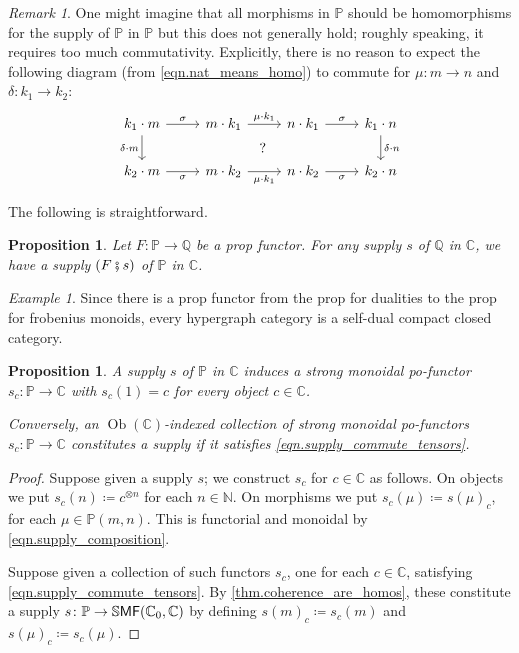 \documentclass[11pt, oneside, article]{memoir}
\theoremstyle{plain}
\newtheorem{proposition}[theorem]{Proposition}
\theoremstyle{definition}
\theoremstyle{remark}
\newtheorem{example}[theorem]{Example}
\newtheorem{remark}[theorem]{Remark}
\newcommand{\Set}[1]{\mathrm{#1}}%
\newcommand{\ccat}[1]{\mathbb{#1}}%
\newcommand{\Cat}[1]{{\mathsf{#1}}}%
\newcommand{\CCat}[1]{\mathbb{\StrLeft{#1}{1}}\Cat{\StrGobbleLeft{#1}{1}}}%
\DeclareMathOperator{\ob}{\Set{Ob}}
\newcommand{\tpow}[1]{^{\otimes #1}}
\newcommand{\ssmf}{\CCat{SMF}}
\newcommand{\cc}{\mathbb{C}}
\newcommand{\nn}{\mathbb{N}}
\newcommand{\pp}{\mathbb{P}}
\newcommand{\cp}{\mathbin{\fatsemi}}
\begin{document}
\begin{remark}
One might imagine that all morphisms in $\pp$ should be homomorphisms for the supply of $\pp$ in $\pp$ but this does not generally hold; roughly speaking, it requires too much commutativity. Explicitly, there is no reason to expect the following diagram (from \cref{eqn.nat_means_homo}) to commute for $\mu\colon m\to n$ and $\delta\colon k_1\to k_2$:
\[
\begin{tikzcd}
  k_1\cdot m\ar[r, "\sigma"]\ar[d, "\delta\cdot m"']&
  m\cdot k_1\ar[r, "\mu\cdot k_1"]\ar[dr, phantom, "?"]&
  n\cdot k_1\ar[r, "\sigma"]&
  k_1\cdot n\ar[d, "\delta\cdot n"]\\
  k_2\cdot m\ar[r, "\sigma"']&
  m\cdot k_2\ar[r, "\mu\cdot k_1"']&
  n\cdot k_2\ar[r, "\sigma"']&
  k_2\cdot n
\end{tikzcd}
\]
\end{remark}


The following is straightforward.
\begin{proposition}\label{prop.change_of_supply}
Let $F\colon\ccat{P}\to\ccat{Q}$ be a prop functor. For any supply $s$ of $\ccat{Q}$ in $\cc$, we have a supply $(F\cp s)$ of $\pp$ in $\cc$.
\end{proposition}

\begin{example}
  Since there is a prop functor from the prop for dualities to the prop for frobenius monoids, every hypergraph category is a self-dual compact closed category.
\end{example}

\begin{proposition}\label{prop.supply_each_object}
A supply $s$ of $\pp$ in $\cc$ induces a strong monoidal po-functor $s_c\colon\pp\to\cc$ with $s_c(1)=c$ for every object $c\in\cc$. 

Conversely, an $\ob(\cc)$-indexed collection of strong monoidal po-functors $s_c\colon\pp\to\cc$ constitutes a supply if it satisfies \cref{eqn.supply_commute_tensors}.
\end{proposition}
\begin{proof}
Suppose given a supply $s$; we construct $s_c$ for $c\in\cc$ as follows. On objects we put $s_c(n)\coloneqq c\tpow{n}$ for each $n\in\nn$. On morphisms we put $s_c(\mu)\coloneqq s(\mu)_c$, for each $\mu\in\pp(m,n)$. This is functorial and monoidal by \cref{eqn.supply_composition}.

Suppose given a collection of such functors $s_c$, one for each $c\in\cc$, satisfying \cref{eqn.supply_commute_tensors}. By \cref{thm.coherence_are_homos}, these constitute a supply $s\colon\pp\to\ssmf(\cc_0,\cc)$ by defining $s(m)_c\coloneqq s_c(m)$ and $s(\mu)_c\coloneqq s_c(\mu)$.
\end{proof}
\end{document}
